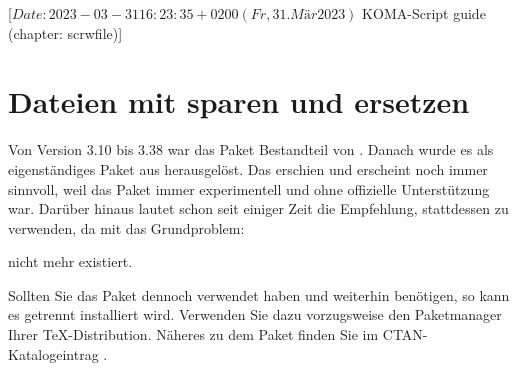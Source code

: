 %
%
%
%
%
%
%

                 [$Date: 2023-03-31 16:23:35 +0200 (Fr, 31. Mär 2023) $
                  KOMA-Script guide (chapter: scrwfile)]

\chapter{Dateien mit  sparen und ersetzen}

\BeginIndexGroup
{}%
Von Version 3.10 bis 3.38 war das Paket
\href{https://www.ctan.org/pkg/scrwfile}{} Bestandteil von
\KOMAScript. Danach wurde es als eigenständiges Paket aus \KOMAScript{}
herausgelöst. Das erschien und erscheint noch immer sinnvoll, weil das Paket
immer experimentell und ohne offizielle Unterstützung war. Darüber hinaus
lautet schon seit einiger Zeit die Empfehlung, stattdessen \LuaLaTeX{} zu
verwenden, da mit \LuaLaTeX{} das Grundproblem:
nicht mehr existiert.

Sollten Sie das Paket dennoch verwendet haben und weiterhin benötigen, so kann
es getrennt installiert wird. Verwenden Sie dazu vorzugsweise den Paketmanager
Ihrer \TeX-Distribution. Näheres zu dem Paket finden Sie im
CTAN-Katalogeintrag \cite{package:scrwfile}.%
\EndIndexGroup


